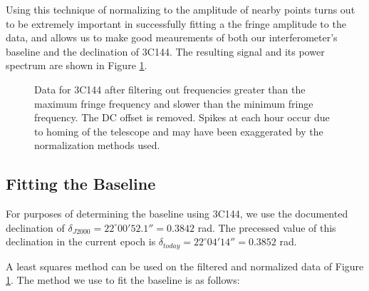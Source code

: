 \documentclass[12pt]{article}
\begin{document}
Using this technique of normalizing to the amplitude of nearby points turns out to be extremely important in successfully fitting a the fringe amplitude to the data, and allows us to make good meaurements of both our interferometer's baseline and the declination of 3C144. The resulting signal and its power spectrum are shown in Figure \ref{fig:filtered}.

\begin{figure}[H]
\caption[SODUMB]{Data for 3C144 after filtering out frequencies greater than the maximum fringe frequency and slower than the minimum fringe frequency. The DC offset is removed. Spikes at each hour occur due to homing of the telescope and may have been exaggerated by the normalization methods used.}
\label{fig:filtered}
\end{figure}

\subsection{Fitting the Baseline}
For purposes of determining the baseline using 3C144, we use the documented declination of $\delta_{J2000} = 22^\circ 00'52.1'' = 0.3842$ rad. The precessed value of this declination in the current epoch is $\delta_{today} = 22^\circ 04'14'' = 0.3852$ rad.

A least squares method can be used on the filtered and normalized data of Figure \ref{fig:filtered}. The method we use to fit the baseline is as follows:
\end{document}

